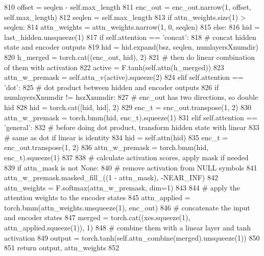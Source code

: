\begin{DoxyCode}
810                 offset = seqlen - self.max\_length
811                 enc\_out = enc\_out.narrow(1, offset, self.max\_length)
812                 seqlen = self.max\_length
813             \textcolor{keywordflow}{if} attn\_weights.size(1) > seqlen:
814                 attn\_weights = attn\_weights.narrow(1, 0, seqlen)
815         \textcolor{keywordflow}{else}:
816             hid = last\_hidden.unsqueeze(1)
817             \textcolor{keywordflow}{if} self.attention == \textcolor{stringliteral}{'concat'}:
818                 \textcolor{comment}{# concat hidden state and encoder outputs}
819                 hid = hid.expand(bsz, seqlen, numlayersXnumdir)
820                 h\_merged = torch.cat((enc\_out, hid), 2)
821                 \textcolor{comment}{# then do linear combination of them with activation}
822                 active = F.tanh(self.attn(h\_merged))
823                 attn\_w\_premask = self.attn\_v(active).squeeze(2)
824             \textcolor{keywordflow}{elif} self.attention == \textcolor{stringliteral}{'dot'}:
825                 \textcolor{comment}{# dot product between hidden and encoder outputs}
826                 \textcolor{keywordflow}{if} numlayersXnumdir != hszXnumdir:
827                     \textcolor{comment}{# enc\_out has two directions, so double hid}
828                     hid = torch.cat([hid, hid], 2)
829                 enc\_t = enc\_out.transpose(1, 2)
830                 attn\_w\_premask = torch.bmm(hid, enc\_t).squeeze(1)
831             \textcolor{keywordflow}{elif} self.attention == \textcolor{stringliteral}{'general'}:
832                 \textcolor{comment}{# before doing dot product, transform hidden state with linear}
833                 \textcolor{comment}{# same as dot if linear is identity}
834                 hid = self.attn(hid)
835                 enc\_t = enc\_out.transpose(1, 2)
836                 attn\_w\_premask = torch.bmm(hid, enc\_t).squeeze(1)
837 
838             \textcolor{comment}{# calculate activation scores, apply mask if needed}
839             \textcolor{keywordflow}{if} attn\_mask \textcolor{keywordflow}{is} \textcolor{keywordflow}{not} \textcolor{keywordtype}{None}:
840                 \textcolor{comment}{# remove activation from NULL symbols}
841                 attn\_w\_premask.masked\_fill\_((1 - attn\_mask), -NEAR\_INF)
842             attn\_weights = F.softmax(attn\_w\_premask, dim=1)
843 
844         \textcolor{comment}{# apply the attention weights to the encoder states}
845         attn\_applied = torch.bmm(attn\_weights.unsqueeze(1), enc\_out)
846         \textcolor{comment}{# concatenate the input and encoder states}
847         merged = torch.cat((xes.squeeze(1), attn\_applied.squeeze(1)), 1)
848         \textcolor{comment}{# combine them with a linear layer and tanh activation}
849         output = torch.tanh(self.attn\_combine(merged).unsqueeze(1))
850 
851         \textcolor{keywordflow}{return} output, attn\_weights
852 \end{DoxyCode}


